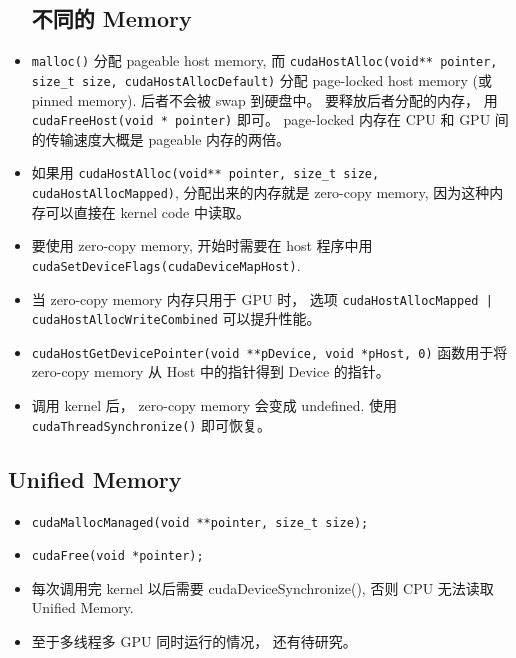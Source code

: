 \begin{itemize}
\subsection{不同的 Memory}
\item \verb`malloc()` 分配 pageable host memory, 而 \verb`cudaHostAlloc(void** pointer, size_t size, cudaHostAllocDefault)` 分配 page-locked host memory (或 pinned memory). 后者不会被 swap 到硬盘中。 要释放后者分配的内存， 用 \verb`cudaFreeHost(void * pointer)` 即可。 page-locked 内存在 CPU 和 GPU 间的传输速度大概是 pageable 内存的两倍。
\item 如果用 \verb`cudaHostAlloc(void** pointer, size_t size, cudaHostAllocMapped)`, 分配出来的内存就是 zero-copy memory, 因为这种内存可以直接在 kernel code 中读取。
\item 要使用 zero-copy memory, 开始时需要在 host 程序中用 \verb`cudaSetDeviceFlags(cudaDeviceMapHost)`.
\item 当 zero-copy memory 内存只用于 GPU 时， 选项 \verb`cudaHostAllocMapped | cudaHostAllocWriteCombined` 可以提升性能。
\item \verb`cudaHostGetDevicePointer(void **pDevice, void *pHost, 0)` 函数用于将 zero-copy memory 从 Host 中的指针得到 Device 的指针。
\item 调用 kernel 后， zero-copy memory 会变成 undefined. 使用 \verb`cudaThreadSynchronize()` 即可恢复。
\end{itemize}

\subsection{Unified Memory}
\begin{itemize}
\item \verb|cudaMallocManaged(void **pointer, size_t size);|
\item \verb|cudaFree(void *pointer);|
\item 每次调用完 kernel 以后需要 cudaDeviceSynchronize(), 否则 CPU 无法读取 Unified Memory.
\item 至于多线程多 GPU 同时运行的情况， 还有待研究。
\end{itemize}

